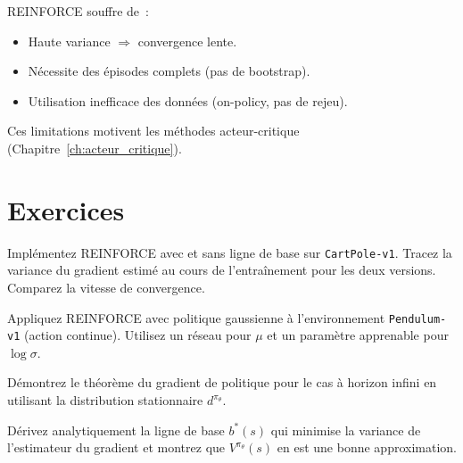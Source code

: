 \begin{attention}[title=\textbf{Limitations de REINFORCE}]
REINFORCE souffre de~:
\begin{itemize}
    \item Haute variance $\Rightarrow$ convergence lente.
    \item N\'ecessite des \'episodes complets (pas de bootstrap).
    \item Utilisation inefficace des donn\'ees (on-policy, pas de rejeu).
\end{itemize}
Ces limitations motivent les m\'ethodes acteur-critique (Chapitre~\ref{ch:acteur_critique}).
\end{attention}

\section{Exercices}

\begin{exercice}
Impl\'ementez REINFORCE avec et sans ligne de base sur \texttt{CartPole-v1}.
Tracez la variance du gradient estim\'e au cours de l'entra\^inement pour les
deux versions. Comparez la vitesse de convergence.
\end{exercice}

\begin{exercice}
Appliquez REINFORCE avec politique gaussienne \`a l'environnement
\texttt{Pendulum-v1} (action continue). Utilisez un r\'eseau pour $\mu$ et
un param\`etre apprenable pour $\log \sigma$.
\end{exercice}

\begin{exercice}
D\'emontrez le th\'eor\`eme du gradient de politique pour le cas \`a horizon
infini en utilisant la distribution stationnaire $d^{\pi_\theta}$.
\end{exercice}

\begin{exercice}
D\'erivez analytiquement la ligne de base $b^*(s)$ qui minimise la variance
de l'estimateur du gradient et montrez que $V^{\pi_\theta}(s)$ en est une
bonne approximation.
\end{exercice}
